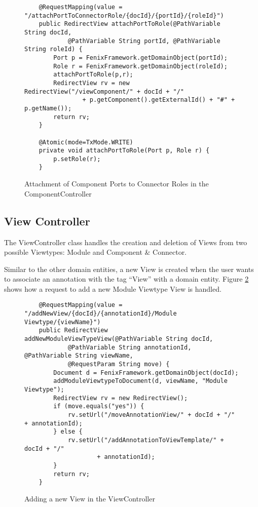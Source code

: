 \begin{figure}[h]
\lstset{style=customjava}
\begin{lstlisting}
	@RequestMapping(value = "/attachPortToConnectorRole/{docId}/{portId}/{roleId}")
	public RedirectView attachPortToRole(@PathVariable String docId,
			@PathVariable String portId, @PathVariable String roleId) {
		Port p = FenixFramework.getDomainObject(portId);
		Role r = FenixFramework.getDomainObject(roleId);
		attachPortToRole(p,r);
		RedirectView rv = new RedirectView("/viewComponent/" + docId + "/"
				+ p.getComponent().getExternalId() + "#" + p.getName());
		return rv;
	}
	
	@Atomic(mode=TxMode.WRITE)
	private void attachPortToRole(Port p, Role r) {
		p.setRole(r);
	}
\end{lstlisting}
\caption{Attachment of Component Ports to Connector Roles in the ComponentController}
\label{figure:ComponentControllerAttachment}
\end{figure}

\subsection{View Controller}
\label{substection:viewController}

The ViewController class handles the creation and deletion of Views from two possible Viewtypes: Module and Component \& Connector. 

Similar to the other domain entities, a new View is created when the user wants to associate an annotation with the tag ``View'' with a domain entity. Figure \ref{figure:ViewControllerAddModuleViewtype} shows how a request to add a new Module Viewtype View is handled.

\begin{figure}[h]
\lstset{style=customjava}
\begin{lstlisting}
	@RequestMapping(value = "/addNewView/{docId}/{annotationId}/Module Viewtype/{viewName}")
	public RedirectView addNewModuleViewTypeView(@PathVariable String docId,
			@PathVariable String annotationId, @PathVariable String viewName,
			@RequestParam String move) {
		Document d = FenixFramework.getDomainObject(docId);
		addModuleViewtypeToDocument(d, viewName, "Module Viewtype");
		RedirectView rv = new RedirectView();
		if (move.equals("yes")) {
			rv.setUrl("/moveAnnotationView/" + docId + "/" + annotationId);
		} else {
			rv.setUrl("/addAnnotationToViewTemplate/" + docId + "/"
					+ annotationId);
		}
		return rv;
	}
\end{lstlisting}
\caption{Adding a new View in the ViewController}
\label{figure:ViewControllerAddModuleViewtype}
\end{figure}

